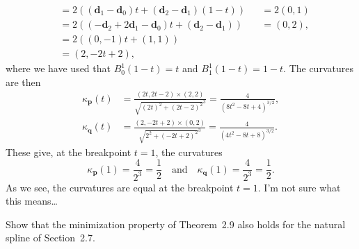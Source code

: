 \begin{solution}
\begin{align*}
        &= 2 \left(\left( \mathbf{d}_1 - \mathbf{d}_0 \right) t + \left( \mathbf{d}_2 - \mathbf{d}_1 \right) (1 - t)\right) &
        &= 2 \left(0, 1\right) \\
        &= 2 \left(
            (-\mathbf{d}_2 + 2 \mathbf{d}_1 - \mathbf{d}_0)t + (\mathbf{d}_2 - \mathbf{d}_1)
        \right) &
        &= (0, 2), \\
        &= 2 \left(
            (0, -1)t + (1, 1)
        \right) \\
        &= (2, - 2t + 2),
    \end{align*}
    where we have used that $B_0^1(1 - t) = t$ and $B_1^1(1 - t) = 1 - t$.
    The curvatures are then
    \begin{align*}
        \kappa_{\mathbf{p}}(t) &= \frac{(2t, 2t - 2) \times (2, 2)}{\sqrt{(2t)^2 + (2t - 2)^2}^3} = \frac{4}{(8t^2 - 8t + 4)^{3/2}}, \\
        \kappa_{\mathbf{q}}(t) &= \frac{(2, -2t + 2) \times (0, 2)}{\sqrt{2^2 + (-2t + 2)^2}^3} = \frac{4}{(4t^2 - 8t + 8)^{3/2}}.
    \end{align*}
    These give, at the breakpoint $t = 1$, the curvatures
    \begin{equation*}
        \kappa_{\mathbf{p}}(1) = \frac{4}{2^3} = \frac{1}{2}
        \quad \text{and} \quad
        \kappa_{\mathbf{q}}(1) = \frac{4}{2^3} = \frac{1}{2}.
    \end{equation*}
    As we see, the curvatures are equal at the breakpoint $t = 1$.
    I'm not sure what this means\dots
\end{solution}

\begin{exercise}
    Show that the minimization property of Theorem~2.9 also holds for the natural spline of Section~2.7.
\end{exercise}

